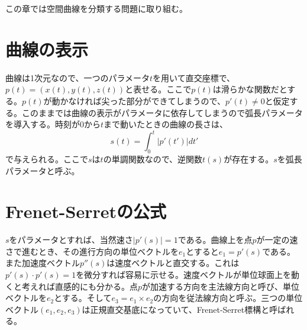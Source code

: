     この章では空間曲線を分類する問題に取り組む。
    \section{曲線の表示}
        曲線は1次元なので、一つのパラメータ$t$を用いて直交座標で、$p(t)=(x(t),y(t),z(t))$と表せる。ここで$p(t)$は滑らかな関数だとする。$p(t)$が動かなければ尖った部分ができてしまうので、$p'(t)\neq 0$と仮定する。このままでは曲線の表示がパラメータに依存してしまうので弧長パラメータを導入する。時刻が0から$t$まで動いたときの曲線の長さは、
            \[s(t) = \int_0^t |p'(t')|dt'\]
        で与えられる。ここで$s$は$t$の単調関数なので、逆関数$t(s)$が存在する。$s$を弧長パラメータと呼ぶ。

    \section{Frenet-Serretの公式}
        $s$をパラメータとすれば、当然速さ$|p'(s)| = 1$である。曲線上を点$p$が一定の速さで進むとき、その進行方向の単位ベクトルを$e_1$とすると$e_1 = p'(s)$である。また加速度ベクトル$p''(s)$は速度ベクトルと直交する。これは$p'(s)\cdot p'(s) = 1$を微分すれば容易に示せる。速度ベクトルが単位球面上を動くと考えれば直感的にも分かる。点$p$が加速する方向を主法線方向と呼び、単位ベクトルを$e_2$とする。そして$e_3 = e_1\times e_2$の方向を従法線方向と呼ぶ。三つの単位ベクトル$(e_1,e_2,e_3)$は正規直交基底になっていて、Frenet-Serret標構と呼ばれる。

